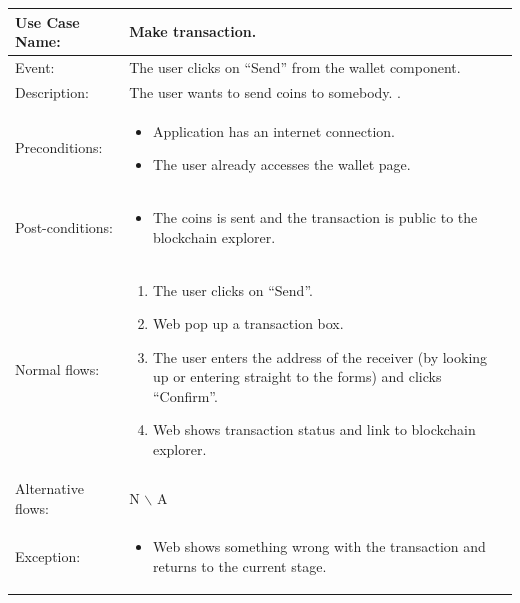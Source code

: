 \begin{table}[]
    \begin{tabular}{| m{4cm} | m{11cm} |}
        \hline
        Use Case Name:     & Make transaction.                                    \\ \hline
        Event:             & The user clicks on “Send” from the wallet component. \\ \hline
        Description:       & The user wants to send coins to somebody.        .   \\ \hline
        Preconditions:     & \begin{itemize}
            \item Application has an internet connection.
            \item The user already accesses the wallet page.
        \end{itemize}                           \\ \hline
        Post-conditions:   & \begin{itemize}
            \item The coins is sent and the transaction is public to the blockchain explorer.
        \end{itemize}                           \\ \hline
        Normal flows:      & \begin{enumerate}
            \item The user clicks on “Send”.
            \item Web pop up a transaction box.
            \item The user enters the address of the receiver (by looking up or entering straight to the forms) and clicks “Confirm”.
            \item Web shows transaction status and link to blockchain explorer.
        \end{enumerate}                           \\ \hline
        Alternative flows: & N $\backslash$ A                                     \\ \hline
        Exception:         & \begin{itemize}
            \item {Web shows something wrong with the transaction and returns to the current stage.}
        \end{itemize}                           \\ \hline
    \end{tabular}
\end{table}

\newpage
